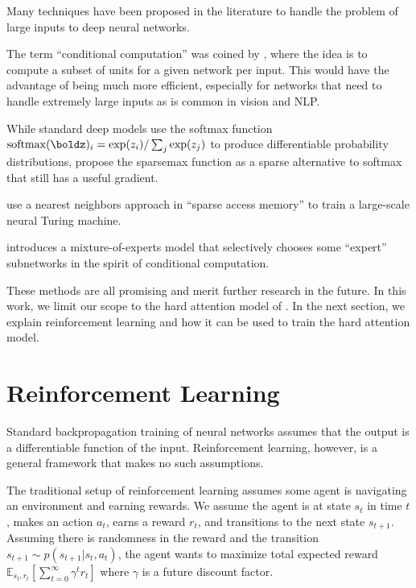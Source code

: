 \documentclass[11pt]{report}
\begin{document}

Many techniques have been proposed in the literature to handle the problem of large inputs to deep neural networks.

The term ``conditional computation'' was coined by \citet{BengioLC13}, where the idea is to compute a subset of units for a given network per input. This would have the advantage of being much more efficient, especially for networks that need to handle extremely large inputs as is common in vision and NLP.

While standard deep models use the softmax function $\mathrm{softmax}(\boldz)_i = \exp(z_i) / \sum_j \exp(z_j)$ to produce differentiable probability distributions, \citet{martins2016sparsemax} propose the sparsemax function as a sparse alternative to softmax that still has a useful gradient.

\citet{rae2016sparsememory} use a nearest neighbors approach in ``sparse access memory'' to train a large-scale neural Turing machine.

\citet{Shazeer2017} introduces a mixture-of-experts model that selectively chooses some ``expert'' subnetworks in the spirit of conditional computation.

These methods are all promising and merit further research in the future. In this work, we limit our scope to the hard attention model of \citet{xu2015captioning}. In the next section, we explain reinforcement learning and how it can be used to train the hard attention model.

\section{Reinforcement Learning}

Standard backpropagation training of neural networks assumes that the output is a differentiable function of the input. Reinforcement learning, however, is a general framework that makes no such assumptions.

The traditional setup of reinforcement learning assumes some agent is navigating an environment and earning rewards. We assume the agent is at state $s_t$ in time $t$, makes an action $a_t$, earns a reward $r_t$, and transitions to the next state $s_{t+1}$. Assuming there is randomness in the reward and the transition $s_{t+1} \sim p(s_{t+1} | s_t, a_t)$, the agent wants to maximize total expected reward $\mathbb{E}_{s_t, r_t} [\sum_{t=0}^\infty \gamma^t r_t]$ where $\gamma$ is a future discount factor.
\end{document}
